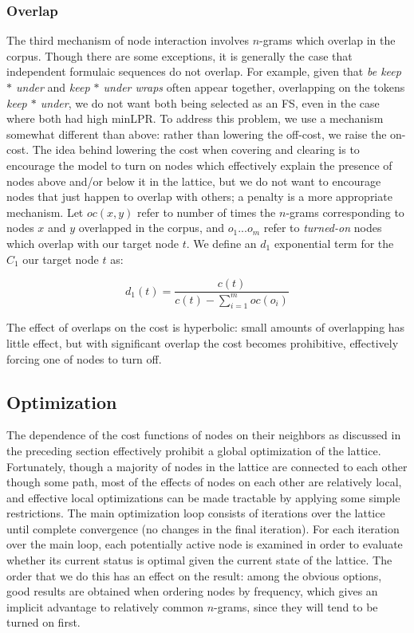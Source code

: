 \documentclass[11pt]{article}
\newcommand{\dotts}{...}
\newcommand{\gap}{$*$\xspace}
\newcommand{\ex}[1]{\textit{#1}\xspace}
\newcommand{\termemph}[1]{\textit{#1}\xspace}
\begin{document}
\subsubsection{Overlap}

The third mechanism of node interaction involves $n$-grams which overlap in the corpus. Though there are some exceptions, it is generally the case that independent formulaic sequences do not overlap. For example, given that \ex{be keep \gap under} and \ex{keep \gap under wraps} often appear together, overlapping on the tokens \ex{keep \gap under}, we do not want both being selected as an FS, even in the case where both had high minLPR. To address this problem, we use a mechanism somewhat different than above: rather than lowering the off-cost, we raise the on-cost. The idea behind lowering the cost when covering and clearing is to encourage the model to turn on nodes which effectively explain the presence of nodes above and/or below it in the lattice, but we do not want to encourage nodes that just happen to overlap with others; a penalty is a more appropriate mechanism. Let $oc(x,y)$ refer to number of times the $n$-grams corresponding to nodes $x$ and $y$ overlapped in the corpus, and $o_1\dotts o_m$ refer to \termemph{turned-on} nodes which overlap with our target node $t$. We define an $d_1$ exponential term for the $C_1$ our target node $t$ as:

\begin{displaymath}
d_{1}(t) = \frac{c(t)}{c(t) - \sum_{i=1}^{m}{oc(o_i)}}
\end{displaymath}

The effect of overlaps on the cost is hyperbolic: small amounts of overlapping has little effect, but with significant overlap the cost becomes prohibitive, effectively forcing one of nodes to turn off. 

 
\subsection{Optimization}

The dependence of the cost functions of nodes on their neighbors as discussed in the preceding section effectively prohibit a global optimization of the lattice. Fortunately, though a majority of nodes in the lattice are connected to each other though some path, most of the effects of nodes on each other are relatively local, and effective local optimizations can be made tractable by applying some simple restrictions. The main optimization loop consists of iterations over the lattice until complete convergence (no changes in the final iteration). For each iteration over the main loop, each potentially active node is examined in order to evaluate whether its current status is optimal given the current state of the lattice. The order that we do this has an effect on the result: among the obvious options, good results are obtained when ordering nodes by frequency, which gives an implicit advantage to relatively common $n$-grams, since they will tend to be turned on first.
\end{document}
